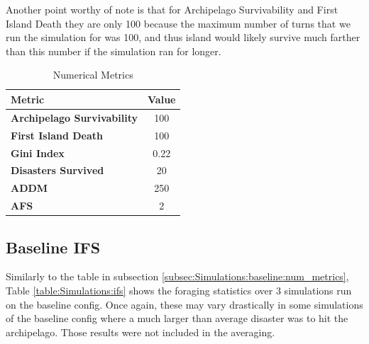 Another point worthy of note is that for Archipelago Survivability and First Island Death they are only 100 because the maximum number of turns that we run the simulation for was 100, and thus island would likely survive much farther than this number if the simulation ran for longer.
\begin{table}[htb]
    \centering
    \begin{tabular}{|l|c|}
    \hline
    \textbf{Metric}                     & \textbf{Value} \\ \hline
    \textbf{Archipelago Survivability}  & 100     \\
    \textbf{First Island Death}         & 100     \\
    \textbf{Gini Index}                 & 0.22     \\
    \textbf{Disasters Survived}         & 20     \\
    \textbf{ADDM}                       & 250     \\
    \textbf{AFS}                        & 2     \\ \hline
\end{tabular}
\caption{Numerical Metrics}
\label{table:Simulations:num_metric}
\end{table}

\subsection{Baseline IFS}
\label{subsec:Simulations:baseline:ifs}

Similarly to the table in subsection \ref{subsec:Simulations:baseline:num_metrics}, Table \ref{table:Simulations:ifs} shows the foraging statistics over 3 simulations run on the baseline config. Once again, these may vary drastically in some simulations of the baseline config where a much larger than average disaster was to hit the archipelago. Those results were not included in the averaging.

